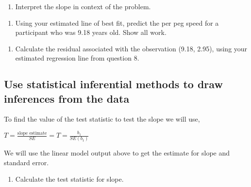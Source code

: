 \documentclass[
]{report}
\providecommand{\tightlist}{%
  \setlength{\itemsep}{0pt}\setlength{\parskip}{0pt}}
\begin{document}
\vspace{1in}

\begin{enumerate}
\def\labelenumi{\arabic{enumi}.}
\setcounter{enumi}{8}
\tightlist
\item
  Interpret the slope in context of the problem.
\end{enumerate}

\vspace{1in}

\begin{enumerate}
\def\labelenumi{\arabic{enumi}.}
\setcounter{enumi}{9}
\tightlist
\item
  Using your estimated line of best fit, predict the per peg speed for a participant who was 9.18 years old. Show all work.
\end{enumerate}

\vspace{1in}

\begin{enumerate}
\def\labelenumi{\arabic{enumi}.}
\setcounter{enumi}{10}
\tightlist
\item
  Calculate the residual associated with the observation (9.18, 2.95), using your estimated regression line from question 8.
\end{enumerate}

\vspace{1in}

\hypertarget{use-statistical-inferential-methods-to-draw-inferences-from-the-data}{%
\subsection{Use statistical inferential methods to draw inferences from the data}\label{use-statistical-inferential-methods-to-draw-inferences-from-the-data}}

To find the value of the test statistic to test the slope we will use,

\(T = \frac{\mbox{slope estimate}}{SE} = T = \frac{b_1}{SE(b_1)}\)

We will use the linear model output above to get the estimate for slope and standard error.

\begin{enumerate}
\def\labelenumi{\arabic{enumi}.}
\setcounter{enumi}{11}
\tightlist
\item
  Calculate the test statistic for slope.
\end{enumerate}

\vspace{1in}
\end{document}
